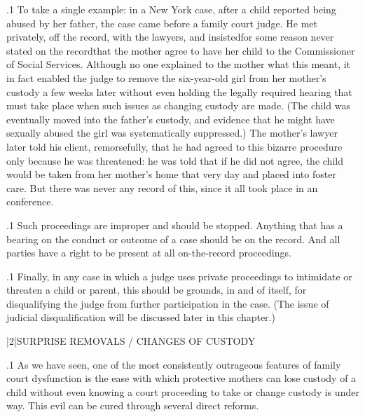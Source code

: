 \documentclass[11pt, twoside]{article}
\begin{document}
{\p.1{%
To take a single example: in a New York case, after a child reported
being abused by her father, the case came before a family court judge. He
met privately, off the record, with the lawyers, and insisted\mdash{}for some
reason never stated on the record\mdash{}that the mother agree to have her
child  to the Commissioner of Social Services. Although
no one explained to the mother what this meant, it in fact enabled the
judge to remove the six-year-old girl from her mother’s custody a few
weeks later without even holding the legally required hearing that must
take place when such issues as changing custody are made. (The child
was eventually moved into the father’s custody, and evidence that he
might have sexually abused the girl was systematically suppressed.) The
mother’s lawyer later told his client, remorsefully, that he had agreed to
this bizarre procedure only because he was threatened: he was told that
if he did not agree, the child would be taken from her mother’s home
that very day and placed into foster care. But there was never any record
of this, since it all took place in an  conference.
}%

\p.1{%
Such proceedings are improper and should be stopped. Anything that
has a bearing on the conduct or outcome of a case should be on the
record. And all parties have a right to be present at all on-the-record
proceedings.
}%

\p.1{%
Finally, in any case in which a judge uses private proceedings to intimidate or threaten a child or parent, this should be grounds, in and
of itself, for disqualifying the judge from further participation in the
case. (The issue of judicial disqualification will be discussed later in this
chapter.)
}%


\s|2|{SURPRISE REMOVALS / CHANGES OF CUSTODY}

\p.1{%
\noindent{}As we have seen, one of the most consistently outrageous features of
family court dysfunction is the ease with which protective mothers can
lose custody of a child without even knowing a court proceeding to take
or change custody is under way. This evil can be cured through several
direct reforms.
}%

}
\end{document}
